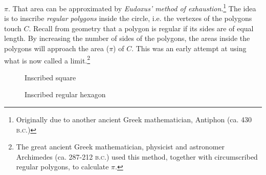 {\begin{enumerate}[item-label=\bfseries \arabic*.]
  $\pi$. That area can be approximated by \emph{Eudoxus' method of
  exhaustion}.\footnote{Originally
  due  to another ancient Greek mathematician, Antiphon (ca. 430 \textsc{b.c.})}
  The idea is to inscribe \emph{regular polygons} inside
  the circle, i.e. the vertexes of the polygons touch $C$. Recall from geometry
  that a polygon is regular if its sides are of equal length. By increasing the
  number of sides of the polygons, the areas inside the polygons will approach
  the area ($\pi$) of $C$. This was an early attempt at using what is now
  called a limit.\footnote{The great ancient Greek mathematician, physicist and
  astronomer Archimedes (ca. 287-212 \textsc{b.c.}) used this method, together
  with circumscribed regular polygons, to calculate $\pi$.}

\begin{figure}[ht]
\begin{minipage}[b]{7.5cm}
 \begin{center}
  \vspace{-5mm}
 \end{center}
 \caption[]{\quad Inscribed square}
 \label{fig:insquare}
\end{minipage}
\begin{minipage}[b]{7.5cm}
 \begin{center}
  \vspace{-5mm}
 \end{center}
 \caption[]{\quad Inscribed regular hexagon}
 \label{fig:inhexagon}
\end{minipage}
\end{figure}\vspace{-2mm}


\end{enumerate}}
